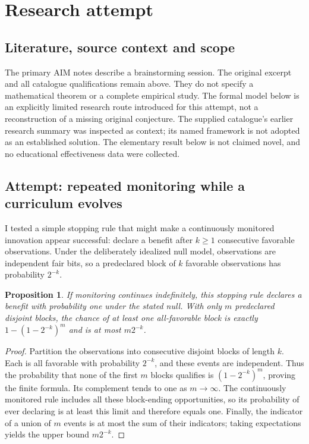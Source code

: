 \documentclass[11pt]{article}
\newtheorem{proposition}{Proposition}
\begin{document}
\section{Research attempt}
\subsection{Literature, source context and scope}
The primary AIM notes describe a brainstorming session. The original excerpt and all catalogue qualifications remain above. They do not specify a mathematical theorem or a complete empirical study. The formal model below is an explicitly limited research route introduced for this attempt, not a reconstruction of a missing original conjecture. The supplied catalogue's earlier research summary was inspected as context; its named framework is not adopted as an established solution. The elementary result below is not claimed novel, and no educational effectiveness data were collected.

\subsection{Attempt: repeated monitoring while a curriculum evolves}
I tested a simple stopping rule that might make a continuously monitored innovation appear successful: declare a benefit after $k\ge1$ consecutive favorable observations. Under the deliberately idealized null model, observations are independent fair bits, so a predeclared block of $k$ favorable observations has probability $2^{-k}$.
\begin{proposition}
If monitoring continues indefinitely, this stopping rule declares a benefit with probability one under the stated null. With only $m$ predeclared disjoint blocks, the chance of at least one all-favorable block is exactly $1-(1-2^{-k})^m$ and is at most $m2^{-k}$.
\end{proposition}
\begin{proof}
Partition the observations into consecutive disjoint blocks of length $k$. Each is all favorable with probability $2^{-k}$, and these events are independent. Thus the probability that none of the first $m$ blocks qualifies is $(1-2^{-k})^m$, proving the finite formula. Its complement tends to one as $m\to\infty$. The continuously monitored rule includes all these block-ending opportunities, so its probability of ever declaring is at least this limit and therefore equals one. Finally, the indicator of a union of $m$ events is at most the sum of their indicators; taking expectations yields the upper bound $m2^{-k}$.
\end{proof}
\end{document}
